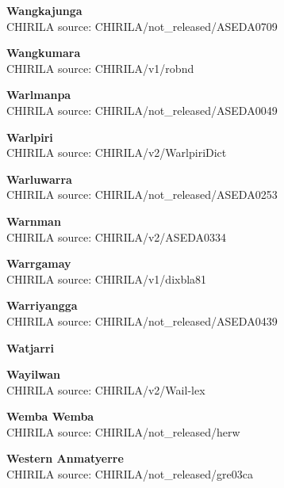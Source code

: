 
\textbf{Wangkajunga}\\
CHIRILA source: CHIRILA/not\_released/ASEDA0709


\textbf{Wangkumara}\\
CHIRILA source: CHIRILA/v1/robnd


\textbf{Warlmanpa}\\
CHIRILA source: CHIRILA/not\_released/ASEDA0049


\textbf{Warlpiri}\\
CHIRILA source: CHIRILA/v2/WarlpiriDict


\textbf{Warluwarra}\\
CHIRILA source: CHIRILA/not\_released/ASEDA0253


\textbf{Warnman}\\
CHIRILA source: CHIRILA/v2/ASEDA0334


\textbf{Warrgamay}\\
CHIRILA source: CHIRILA/v1/dixbla81


\textbf{Warriyangga}\\
CHIRILA source: CHIRILA/not\_released/ASEDA0439


\textbf{Watjarri}\\

\textbf{Wayilwan}\\
CHIRILA source: CHIRILA/v2/Wail-lex


\textbf{Wemba Wemba}\\
CHIRILA source: CHIRILA/not\_released/herw


\textbf{Western Anmatyerre}\\
CHIRILA source: CHIRILA/not\_released/gre03ca


